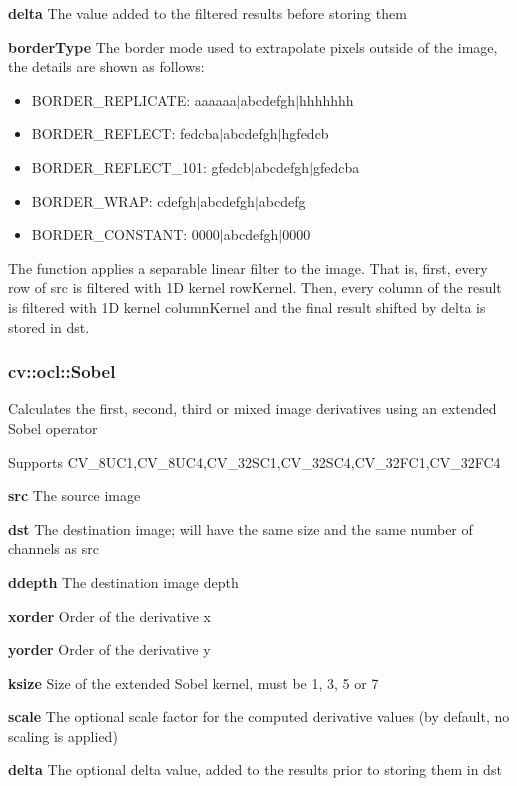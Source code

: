 \documentclass{article}
\begin{document}
\textbf{delta }The value added to the filtered results before storing them

\textbf{borderType }The border mode used to extrapolate pixels outside of
the image, the details are shown as follows:

\begin{itemize}
\item BORDER{\_}REPLICATE: aaaaaa$\vert $abcdefgh$\vert $hhhhhhh
\item BORDER{\_}REFLECT: fedcba$\vert $abcdefgh$\vert $hgfedcb
\item BORDER{\_}REFLECT{\_}101: gfedcb$\vert $abcdefgh$\vert $gfedcba
\item BORDER{\_}WRAP: cdefgh$\vert $abcdefgh$\vert $abcdefg
\item BORDER{\_}CONSTANT: 0000$\vert $abcdefgh$\vert $0000
\end{itemize}

The function applies a separable linear filter to the image. That is, first,
every row of src is filtered with 1D kernel rowKernel. Then, every column of
the result is filtered with 1D kernel columnKernel and the final result
shifted by delta is stored in dst.

\newpage

\subsubsection{cv::ocl::Sobel}
\label{subsubsec:mylabel44}
Calculates the first, second, third or mixed image derivatives using an
extended Sobel operator

Supports CV{\_}8UC1,CV{\_}8UC4,CV{\_}32SC1,CV{\_}32SC4,CV{\_}32FC1,CV{\_}32FC4

\textbf{src }The source image

\textbf{dst }The destination image; will have the same size and the same
number of channels as src

\textbf{ddepth }The destination image depth

\textbf{xorder }Order of the derivative x

\textbf{yorder }Order of the derivative y

\textbf{ksize }Size of the extended Sobel kernel, must be 1, 3, 5 or 7

\textbf{scale }The optional scale factor for the computed derivative values
(by default, no scaling is applied)

\textbf{delta }The optional delta value, added to the results prior to
storing them in dst
\end{document}
